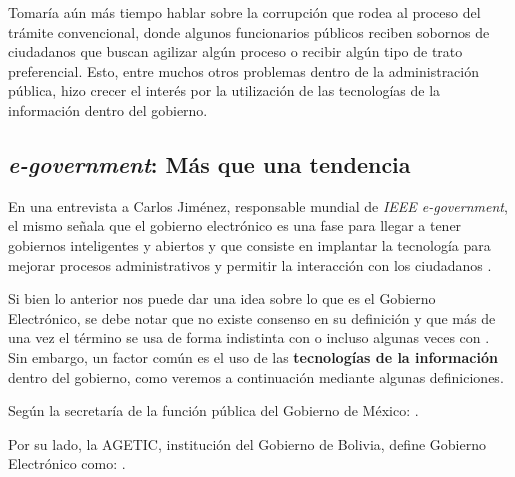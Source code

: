 Tomaría aún más tiempo hablar sobre la corrupción que rodea al proceso del trámite convencional,
donde algunos funcionarios públicos reciben sobornos de ciudadanos que buscan agilizar algún proceso o recibir algún tipo de trato preferencial.
Esto, entre muchos otros problemas dentro de la administración pública, hizo crecer el interés por la utilización de las tecnologías de la información dentro del gobierno.

\subsection{\textit{e-government}: Más que una tendencia}

En una entrevista a Carlos Jiménez, responsable mundial de \textit{IEEE e-government}, el mismo señala que
el gobierno electrónico es una fase para llegar a tener gobiernos inteligentes y abiertos y que
consiste en implantar la tecnología para mejorar procesos administrativos y permitir la interacción con los ciudadanos \cite{digitalGobiernoInteligenteEntrevista2015}.

Si bien lo anterior nos puede dar una idea sobre lo que es el Gobierno Electrónico, se debe notar que no existe consenso en su definición y que más de una vez el término se usa de forma indistinta con  o incluso algunas veces con .
Sin embargo, un factor común es el uso de las \textbf{tecnologías de la información} dentro del gobierno, como veremos a continuación mediante algunas definiciones.

Según la secretaría de la función pública del Gobierno de México:
 \cite{publicaGobiernoDigitalElectronico}.

Por su lado, la AGETIC, institución del Gobierno de Bolivia, define Gobierno Electrónico como:
 \cite{GobiernoElectronico}.

